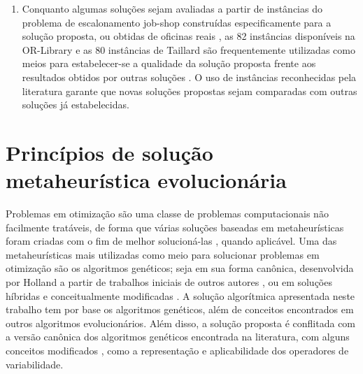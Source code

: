 \documentclass[relatorio,nocolorlinks]{inf-ufg}
\begin{document}
\begin{enumerate}
\item Conquanto algumas solu\c{c}\~{o}es sejam avaliadas a partir de inst\^{a}ncias do problema de escalonamento job-shop constru\'{i}das
especificamente para a solu\c{c}\~{a}o proposta, ou obtidas de oficinas reais \cite{Xing2010} \cite{Liouane2007} \cite{Zhang2009} \cite{Saidi2007}
\cite{Roshanaei2009} \cite{Zhang2010b} \cite{Yin2007} \cite{Manikas2009} \cite{Ma2010}, as 82 inst\^{a}ncias dispon\'{i}veis na OR-Library
\cite{OrLibrary} e as 80 inst\^{a}ncias de Taillard \cite{Taillard1993} s\~{a}o frequentemente utilizadas como meios para estabelecer-se a qualidade
da solu\c{c}\~{a}o proposta frente aos resultados obtidos por outras solu\c{c}\~{o}es \cite{Rego2009} \cite{Pardalos2006} \cite{Kammer2011}
\cite{Ferrolho2007} \cite{Huang2010} \cite{Xiaomei2010} \cite{Zhang2010} \cite{Lin2010} \cite{Goncalves2002}. O uso de inst\^{a}ncias reconhecidas
pela literatura garante que novas solu\c{c}\~{o}es propostas sejam comparadas com outras solu\c{c}\~{o}es j\'{a} estabelecidas.

\end{enumerate}

\chapter{Princ\'{i}pios de solu\c{c}\~{a}o metaheur\'{i}stica evolucion\'{a}ria}
\label{meta}

Problemas em otimiza\c{c}\~{a}o s\~{a}o uma classe de problemas computacionais n\~{a}o facilmente trat\'{a}veis, de forma que
v\'{a}rias solu\c{c}\~{o}es baseadas em metaheur\'{i}sticas foram criadas com o fim de melhor solucion\'{a}-las \cite{Gendreau2010}, quando
aplic\'{a}vel. Uma das metaheur\'{i}sticas mais utilizadas como meio para solucionar problemas em otimiza\c{c}\~{a}o s\~{a}o os algoritmos
gen\'{e}ticos; seja em sua forma can\^{o}nica, desenvolvida por Holland \cite{Holland1992} a partir de trabalhos iniciais de outros autores
\cite{Engelbrecht2007}, ou em solu\c{c}\~{o}es h\'{i}bridas e conceitualmente modificadas \cite{Gendreau2010}. A solu\c{c}\~{a}o algor\'{i}tmica
apresentada neste trabalho tem por base os algoritmos gen\'{e}ticos, al\'{e}m de conceitos encontrados em outros algoritmos evolucion\'{a}rios.
Al\'{e}m disso, a solu\c{c}\~{a}o proposta \'{e} conflitada com a vers\~{a}o can\^{o}nica dos algoritmos gen\'{e}ticos encontrada na literatura,
com alguns conceitos modificados \cite{DeJong2006} \cite{Engelbrecht2007}, como a representa\c{c}\~{a}o e aplicabilidade dos operadores de
variabilidade.
\end{document}
